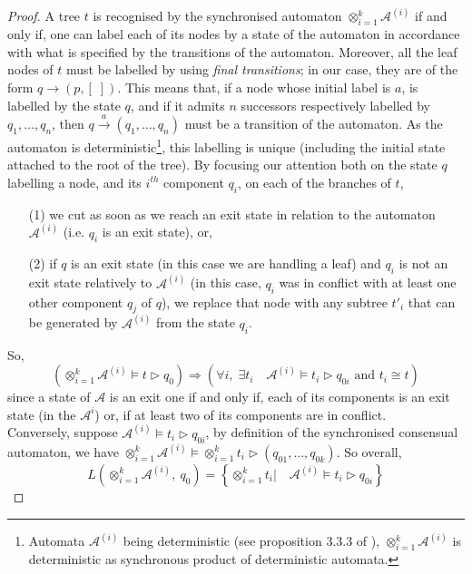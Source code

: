 \begin{proof}
A tree $t$ is recognised by the synchronised automaton $\otimes_{i=1}^{k}\mathcal{A}^{(i)}$ if and only if, one can label each of its nodes by a state of the automaton in accordance with what is specified by the transitions of the automaton. 
Moreover, all the leaf nodes of $t$ must be labelled by using \textit{final transitions}; in our case, they are of the form $q\rightarrow (p, [\;])$.
This means that, if a node whose initial label is $a$, is labelled by the state $q$, and if it admits $n$ successors respectively labelled by $q_1,\ldots,q_n$, then $q\stackrel{a}{\rightarrow}(q_1,\ldots,q_n)$ must be a transition of the automaton. As the automaton is deterministic\footnote{Automata $\mathcal{A}^{(i)}$ being deterministic (see proposition 3.3.3 of \cite{theseTchoupe}), $\otimes_{i=1}^{k}\mathcal{A}^{(i)}$ is deterministic as synchronous product of deterministic automata.}, this labelling is unique (including the initial state attached to the root of the tree). 
By focusing our attention both on the state $q$ labelling a node, and its $i^{th}$ component $q_i$, on each of the branches of $t$, 
\begin{itemize}
	\item[(1)] we cut as soon as we reach an exit state in relation to the automaton $\mathcal{A}^{(i)} $ (i.e. $q_i$ is an exit state), or,
	\item[(2)] if $q$ is an exit state (in this case we are handling a leaf) and $q_i$ is not an exit state relatively to $\mathcal{A}^{(i)}$ (in this case, $q_i$ was in conflict with at least one other component $q_j$ of $q$), we replace that node with any subtree $t'_i$ that can be generated by $\mathcal{A}^{(i)}$ from the state $q_i$.
\end{itemize}
So,
\[
 \left(\otimes_{i=1}^{k}\mathcal{A}^{(i)} \models t \triangleright q_0 \right) \Rightarrow 
\left(\forall i,\;\exists t_i\quad \mathcal{A}^{(i)}\models t_i\triangleright q_{0i}\mbox{ and }t_i\cong t\right)
\]
since a state of $\mathcal{A}$ is an exit one if and only if, each of its components is an exit state (in the $\mathcal{A}^{i}$) or, if at least two of its components are in conflict. \\
Conversely, suppose $ \mathcal{A}^{(i)}\models t_i \triangleright q_{0i}$, by definition of the synchronised consensual automaton, we have $ \otimes_{i=1}^{k}\mathcal{A}^{(i)}\models \otimes_{i=1}^{k}t_i\triangleright (q_{01}, \ldots , q_{0k})$. So overall,
\[
L\left(\otimes_{i=1}^{k}\mathcal{A}^{(i)},~q_0\right) =\left\{ \otimes_{i=1}^{k}t_i | \quad  \mathcal{A}^{(i)}\models t_i\triangleright q_{0i} \right\}
\]


\end{proof}
